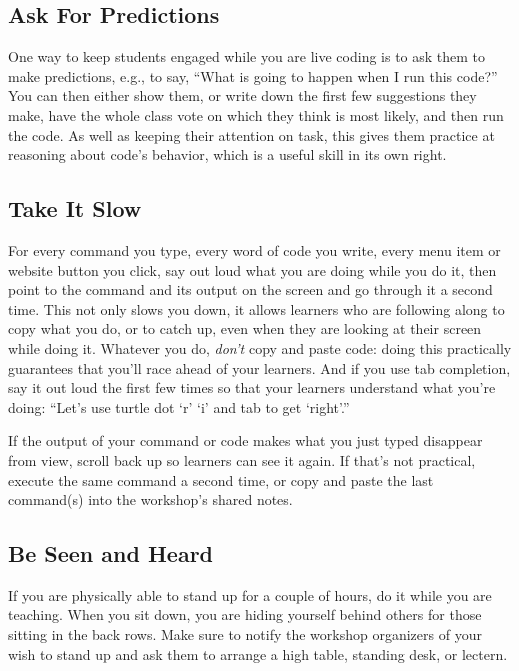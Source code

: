 \subsection{Ask For Predictions}\label{ask-for-predictions}

One way to keep students engaged while you are live coding is to ask
them to make predictions, e.g., to say, ``What is going to happen when I
run this code?'' You can then either show them, or write down the first
few suggestions they make, have the whole class vote on which they think
is most likely, and then run the code. As well as keeping their
attention on task, this gives them practice at reasoning about code's
behavior, which is a useful skill in its own right.

\subsection{Take It Slow}\label{take-it-slow}

For every command you type, every word of code you write, every menu
item or website button you click, say out loud what you are doing while
you do it, then point to the command and its output on the screen and go
through it a second time. This not only slows you down, it allows
learners who are following along to copy what you do, or to catch up,
even when they are looking at their screen while doing it. Whatever you
do, \emph{don't} copy and paste code: doing this practically guarantees that
you'll race ahead of your learners. And if you use tab completion, say
it out loud the first few times so that your learners understand what
you're doing: ``Let's use turtle dot `r' `i' and tab to get `right'.''

If the output of your command or code makes what you just typed
disappear from view, scroll back up so learners can see it again. If
that's not practical, execute the same command a second time, or copy
and paste the last command(s) into the workshop's shared notes.

\subsection{Be Seen and Heard}\label{be-seen-and-heard}

If you are physically able to stand up for a couple of hours, do it
while you are teaching. When you sit down, you are hiding yourself
behind others for those sitting in the back rows. Make sure to notify
the workshop organizers of your wish to stand up and ask them to arrange
a high table, standing desk, or lectern.

